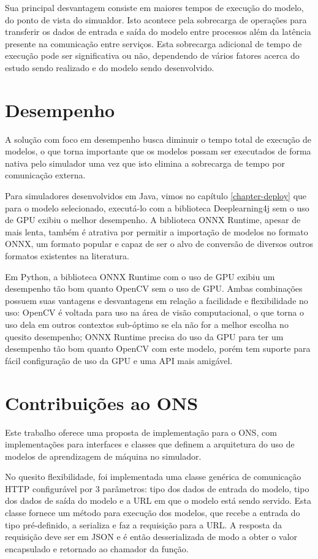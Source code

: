 Sua principal desvantagem consiste em maiores tempos de execução do modelo, do ponto de vista do simualdor. Isto acontece pela sobrecarga de operações para transferir os dados de entrada e saída do modelo entre processos além da latência presente na comunicação entre serviços. Esta sobrecarga adicional de tempo de execução pode ser significativa ou não, dependendo de vários fatores acerca do estudo sendo realizado e do modelo sendo desenvolvido.

\section{Desempenho}

A solução com foco em desempenho busca diminuir o tempo total de execução de modelos, o que torna importante que os modelos possam ser executados de forma nativa pelo simulador uma vez que isto elimina a sobrecarga de tempo por comunicação externa.

Para simuladores desenvolvidos em Java, vimos no capítulo \ref{chapter-deploy} que para o modelo selecionado, executá-lo com a biblioteca Deeplearning4j sem o uso de GPU exibiu o melhor desempenho. A biblioteca ONNX Runtime, apesar de mais lenta, também é atrativa por permitir a importação de modelos no formato ONNX, um formato popular e capaz de ser o alvo de conversão de diversos outros formatos existentes na literatura.

Em Python, a biblioteca ONNX Runtime com o uso de GPU exibiu um desempenho tão bom quanto OpenCV sem o uso de GPU. Ambas combinações possuem suas vantagens e desvantagens em relação a facilidade e flexibilidade no uso: OpenCV é voltada para uso na área de visão computacional, o que torna o uso dela em outros contextos sub-óptimo se ela não for a melhor escolha no quesito desempenho; ONNX Runtime precisa do uso da GPU para ter um desempenho tão bom quanto OpenCV com este modelo, porém tem suporte para fácil configuração de uso da GPU e uma API mais amigável.

\section{Contribuições ao ONS}

Este trabalho oferece uma proposta de implementação para o \acrfull{ONS}, com implementações para interfaces e classes que definem a arquitetura do uso de modelos de aprendizagem de máquina no simulador.

No quesito flexibilidade, foi implementada uma classe genérica de comunicação HTTP configurável por 3 parâmetros: tipo dos dados de entrada do modelo, tipo dos dados de saída do modelo e a URL em que o modelo está sendo servido. Esta classe fornece um método para execução dos modelos, que recebe a entrada do tipo pré-definido, a serializa e faz a requisição para a URL. A resposta da requisição deve ser em JSON e é então desserializada de modo a obter o valor encapsulado e retornado ao chamador da função.

